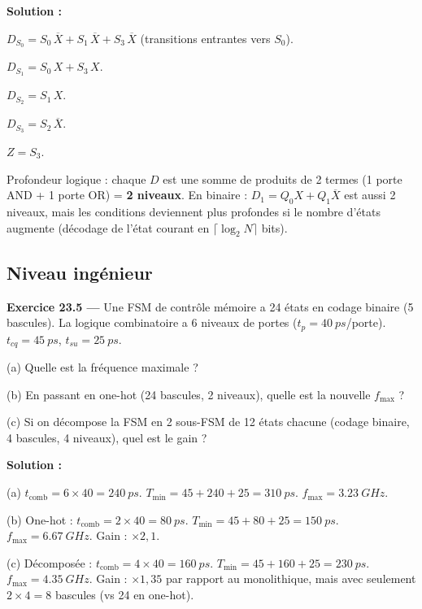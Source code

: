 \documentclass[12pt,a4paper,twoside]{book}
\begin{document}
\begin{pratique}
\textbf{Solution :}

$D_{S_0} = S_0\,\overline{X} + S_1\,\overline{X} + S_3\,\overline{X}$ (transitions entrantes vers $S_0$).

$D_{S_1} = S_0\,X + S_3\,X$.

$D_{S_2} = S_1\,X$.

$D_{S_3} = S_2\,\overline{X}$.

$Z = S_3$.

Profondeur logique : chaque $D$ est une somme de produits de 2 termes (1 porte AND + 1 porte OR) = \textbf{2 niveaux}. En binaire : $D_1 = Q_0 X + Q_1\overline{X}$ est aussi 2 niveaux, mais les conditions deviennent plus profondes si le nombre d'états augmente (décodage de l'état courant en $\lceil\log_2 N\rceil$ bits).
\end{pratique}

\subsection*{Niveau ingénieur}

\textbf{Exercice 23.5 ---} Une FSM de contrôle mémoire a 24 états en codage binaire (5 bascules). La logique combinatoire a 6 niveaux de portes ($t_p = \SI{40}{ps}$/porte). $t_{cq} = \SI{45}{ps}$, $t_{su} = \SI{25}{ps}$.

(a) Quelle est la fréquence maximale ?

(b) En passant en one-hot (24 bascules, 2 niveaux), quelle est la nouvelle $f_{\max}$ ?

(c) Si on décompose la FSM en 2 sous-FSM de 12 états chacune (codage binaire, 4 bascules, 4 niveaux), quel est le gain ?

\begin{pratique}
\textbf{Solution :}

(a) $t_{\text{comb}} = 6\times40 = \SI{240}{ps}$. $T_{\min} = 45+240+25 = \SI{310}{ps}$. $f_{\max} = \SI{3.23}{GHz}$.

(b) One-hot : $t_{\text{comb}} = 2\times40 = \SI{80}{ps}$. $T_{\min} = 45+80+25 = \SI{150}{ps}$. $f_{\max} = \SI{6.67}{GHz}$. Gain : $\times 2{,}1$.

(c) Décomposée : $t_{\text{comb}} = 4\times40 = \SI{160}{ps}$. $T_{\min} = 45+160+25 = \SI{230}{ps}$. $f_{\max} = \SI{4.35}{GHz}$. Gain : $\times 1{,}35$ par rapport au monolithique, mais avec seulement $2\times4 = 8$ bascules (vs 24 en one-hot).
\end{pratique}
\end{document}
